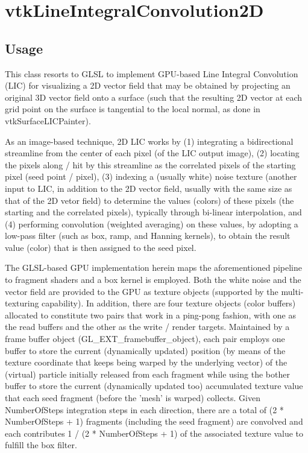 \section{vtkLineIntegralConvolution2D}

\subsection{Usage}

  This class resorts to GLSL to implement GPU-based Line Integral Convolution 
  (LIC) for visualizing a 2D vector field that may be obtained by projecting
  an original 3D vector field onto a surface (such that the resulting 2D 
  vector at each grid point on the surface is tangential to the local normal,
  as done in vtkSurfaceLICPainter). 
  
  As an image-based technique, 2D LIC works by (1) integrating a bidirectional
  streamline from the center of each pixel (of the LIC output image), (2)
  locating the pixels along / hit by this streamline as the correlated pixels
  of the starting pixel (seed point / pixel), (3) indexing a (usually white) 
  noise texture (another input to LIC, in addition to the 2D vector field, 
  usually with the same size as that of the 2D vetor field) to determine the
  values (colors) of these pixels (the starting and the correlated pixels), 
  typically through bi-linear interpolation, and (4) performing convolution
  (weighted averaging) on these values, by adopting a low-pass filter (such 
  as box, ramp, and Hanning kernels), to obtain the result value (color) that
  is then assigned to the seed pixel.

  The GLSL-based GPU implementation herein maps the aforementioned pipeline to
  fragment shaders and a box kernel is employed. Both the white noise and the
  vector field are provided to the GPU as texture objects (supported by the 
  multi-texturing capability). In addition, there are four texture objects 
  (color buffers) allocated to constitute two pairs that work in a ping-pong
  fashion, with one as the read buffers and the other as the write / render 
  targets. Maintained by a frame buffer object (GL\_EXT\_framebuffer\_object),
  each pair employs one buffer to store the current (dynamically updated)
  position (by means of the texture coordinate that keeps being warped by the
  underlying vector) of the (virtual) particle initially released from each 
  fragment while using the bother buffer to store the current (dynamically
  updated too) accumulated texture value that each seed fragment (before the
  'mesh' is warped) collects. Given NumberOfSteps integration steps in each
  direction, there are a total of (2 * NumberOfSteps + 1) fragments (including
  the seed fragment) are convolved and each contributes 1 / (2 * NumberOfSteps
  + 1) of the associated texture value to fulfill the box filter.
  
